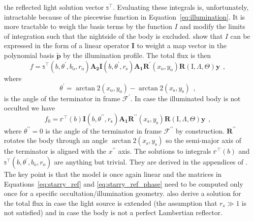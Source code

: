 \documentclass[12pt,dvipsnames]{report}
\newcommand{\hquad}{~~}
\begin{document}
the reflected light solution vector $\mathbb{s}^\intercal$.
Evaluating these integrals is, unfortunately, intractable because of the piecewise
function in Equation~\ref{eq:illumination}. It is more tractable to weigh the basis
terms by the function $I$ and modify the limits of integration such that the nightside
of the body is excluded. \citet{2021arXiv210306275L} show that $I$ can be expressed
in the form of a linear operator $\mathbf{I}$ to weight a map vector  in the polynomial
basis $\tilde{\mathbf{p}}$ by the illumination profile. The total flux is then
\begin{equation}
    f=\mathbb{s}^\intercal\left(b, \theta^{\prime}, b_{\mathrm{o}}, r_{\mathrm{o}}\right) \mathbf{A}_{\mathbf{2}} \mathbf{I}\left(b, \theta^{\prime}, r_{\mathrm{s}}\right) \mathbf{A}_{\mathbf{1}} \mathbf{R}^{\prime}\left(x_{\mathrm{o}}, y_{\mathrm{o}}\right) \mathbf{R}(\mathrm{I}, \Lambda, \Theta) \mathbf{y}
    \hquad,
\end{equation}
where
\begin{equation}
    \theta^{\prime}=\arctan 2\left(x_{\mathrm{o}}, y_{\mathrm{o}}\right)-\arctan 2\left(x_{\mathrm{s}}, y_{\mathrm{s}}\right)
    \hquad,
    \label{eq:starry_ref}
\end{equation}
is the angle of the terminator in frame $\mathcal{F}^\prime$.
In case the illuminated body is not occulted we have
\begin{equation}
    f_{0}=\mathbb{r}^{\intercal}(b) \mathbf{I}\left(b, \theta^{\prime \prime}, r_{\mathrm{s}}\right) \mathbf{A}_{\mathbf{1}} \mathbf{R}^{\prime \prime}\left(x_{\mathrm{s}}, y_{\mathrm{s}}\right) \mathbf{R}(\mathrm{I}, \Lambda, \Theta) \mathbf{y}
    \hquad,
    \label{eq:starry_ref_phase}
\end{equation}
where $\theta^{\prime\prime}=0$ is the angle of the terminator in frame
$\mathcal{F}^{\prime\prime}$ by construction. $\mathbf{R}^{\prime\prime}$ rotates the
body through an angle $\arctan 2\left(x_{\mathrm{s}}, y_{\mathrm{s}}\right)$ so the
semi-major axis of the terminator is aligned with the $x^{\prime \prime}$ axis.
The solutions to integrals
$\mathbb{r}^{\intercal}(b)$ and $\mathbb{s}^{\intercal}\left(b, \theta^{\prime}, b_{\mathrm{o}}, r_{\mathrm{o}}\right)$
are anything but trivial.
They are derived in the appendices of
\citet{2021arXiv210306275L}. The key point is that the model is once again linear and
the matrices in Equations~\ref{eq:starry_ref} and \ref{eq:starry_ref_phase} need to be
computed only once for a specific occultation/illumination geometry.
\citet{2021arXiv210306275L} also derive a solution for the total flux in case the
light source is extended (the assumption that $r_s\gg 1$ is not satisfied) and
in case the body is not a perfect Lambertian reflector.
\end{document}
